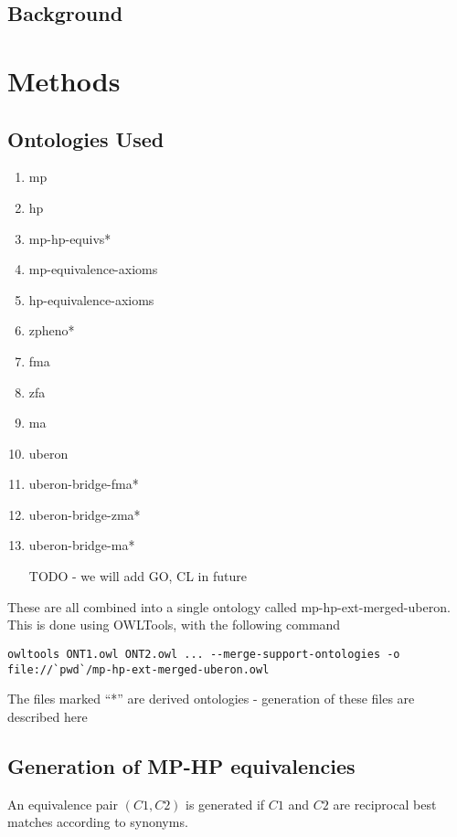 
\subsection{Background}

\section{Methods}

\subsection{Ontologies Used}

\begin{enumerate}
\item mp
\item hp
\item mp-hp-equivs*
\item mp-equivalence-axioms
\item hp-equivalence-axioms
\item zpheno*
\item fma
\item zfa
\item ma
\item uberon
\item uberon-bridge-fma*
\item uberon-bridge-zma*
\item uberon-bridge-ma*
\item [TODO - we will add GO, CL in future]
\end{enumerate}

These are all combined into a single ontology called mp-hp-ext-merged-uberon. This is done using OWLTools, with the following command

\begin{verbatim}
owltools ONT1.owl ONT2.owl ... --merge-support-ontologies -o file://`pwd`/mp-hp-ext-merged-uberon.owl
\end{verbatim}

The files marked ``*'' are derived ontologies - generation of these files are described here

\subsection{Generation of MP-HP equivalencies}

An equivalence pair $(C1,C2)$ is generated if $C1$ and $C2$ are
reciprocal best matches according to synonyms.

